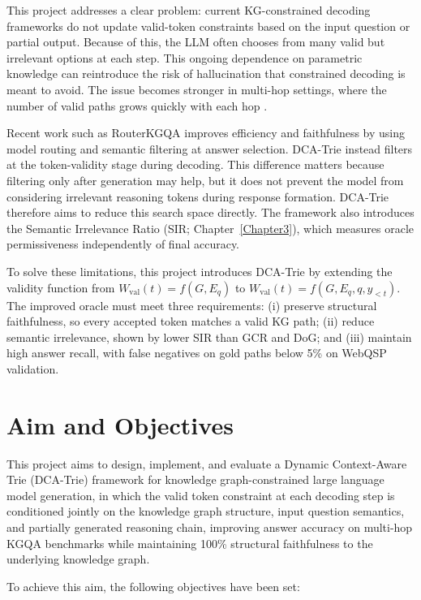 This project addresses a clear problem: current KG-constrained decoding frameworks do not update valid-token constraints based on the input question or partial output. Because of this, the LLM often chooses from many valid but irrelevant options at each step. This ongoing dependence on parametric knowledge can reintroduce the risk of hallucination that constrained decoding is meant to avoid. The issue becomes stronger in multi-hop settings, where the number of valid paths grows quickly with each hop \citep{lan2022survey,he2021improving,talmor2018cwq}.

Recent work such as RouterKGQA \citep{yuan2026routerkgqa} improves efficiency and faithfulness by using model routing and semantic filtering at answer selection. DCA-Trie instead filters at the token-validity stage during decoding. This difference matters because filtering only after generation may help, but it does not prevent the model from considering irrelevant reasoning tokens during response formation. DCA-Trie therefore aims to reduce this search space directly. The framework also introduces the Semantic Irrelevance Ratio (SIR; Chapter~\ref{Chapter3}), which measures oracle permissiveness independently of final accuracy.

To solve these limitations, this project introduces DCA-Trie by extending the validity function from $W_{\mathrm{val}}(t) = f(G, E_q)$ to $W_{\mathrm{val}}(t) = f(G, E_q, q, y_{<t})$. The improved oracle must meet three requirements: (i) preserve structural faithfulness, so every accepted token matches a valid KG path; (ii) reduce semantic irrelevance, shown by lower SIR than GCR and DoG; and (iii) maintain high answer recall, with false negatives on gold paths below 5\% on WebQSP validation.

\section{Aim and Objectives}

This project aims to design, implement, and evaluate a Dynamic Context-Aware Trie (DCA-Trie) framework for knowledge graph-constrained large language model generation, in which the valid token constraint at each decoding step is conditioned jointly on the knowledge graph structure, input question semantics, and partially generated reasoning chain, improving answer accuracy on multi-hop KGQA benchmarks while maintaining 100\% structural faithfulness to the underlying knowledge graph.

To achieve this aim, the following objectives have been set:

